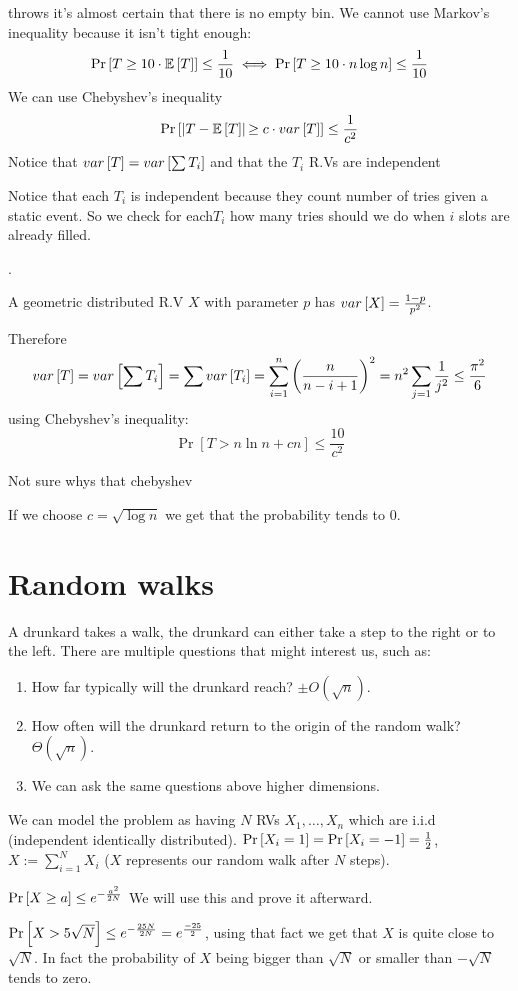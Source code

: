 throws it's almost certain that there is no empty bin. We cannot use
Markov's inequality because it isn't tight enough: 
\[
\Pr\left[T\ge10\cdot\mathbb{E}\left[T\right]\right]\le\frac{1}{10}\iff\Pr\left[T\ge10\cdot n\log n\right]\le\frac{1}{10}
\]
We can use Chebyshev's inequality
\[
\Pr\left[\left|T-\mathbb{E}\left[T\right]\right|\text{\ensuremath{\ge c\cdot var\left[T\right]}}\right]\le\frac{1}{c^{2}}
\]
Notice that $var\left[T\right]=var\left[\sum T_{i}\right]$ and that the $T_{i}$ R.Vs
are independent %
\begin{insight}
Notice that each $T_{i}$ is independent because they count number
of tries given a static event. So we check for each$T_{i}$ how many
tries should we do when $i$ slots are already filled.%
\end{insight}
. 
\begin{remark}
A geometric distributed R.V $X$ with parameter $p$ has $var\left[X\right]=\frac{1-p}{p^{2}}$.
\end{remark}

Therefore 
\[
var\left[T\right]=var\left[\sum T_{i}\right]=\sum var\left[T_{i}\right]=\sum_{i=1}^{n}\left(\frac{n}{n-i+1}\right)^{2}=n^{2}\sum_{j=1}\frac{1}{j^{2}}\le\frac{\pi^{2}}{6}
\]
 using Chebyshev's inequality: 
\[
\Pr\left[T>n\ln n+cn\right]\le\frac{10}{c^{2}}
\]

\begin{insight}
Not sure whys that chebyshev%
\end{insight}
{} If we choose $c=\sqrt{\log n}$ we get that the probability tends
to 0.

\section{Random walks}

A drunkard takes a walk, the drunkard can either take a step to the
right or to the left. There are multiple questions that might interest
us, such as: 
\begin{enumerate}
\item How far typically will the drunkard reach? $\pm O\left(\sqrt{n}\right)$. 
\item How often will the drunkard return to the origin of the random walk?
$\Theta\left(\sqrt{n}\right)$.
\item We can ask the same questions above higher dimensions. 
\end{enumerate}
We can model the problem as having $N$ RVs $X_{1},\dots,X_{n}$ which
are i.i.d (independent identically distributed). $\Pr\left[X_{i}=1\right]=\Pr\left[X_{i}=-1\right]=\frac{1}{2}$,
$X:=\sum\limits _{i=1}^{N}X_{i}$ ($X$ represents our random walk
after $N$ steps). 
\begin{proposition}
$\Pr\left[X\ge a\right]\le e^{-\frac{a^{2}}{2N}}$ We will use this and prove
it afterward. 
\begin{example}
$\Pr\left[X>5\sqrt{N}\right]\le e^{-\frac{25N}{2N}}=e^{\frac{-25}{2}}$, using
that fact we get that $X$ is quite close to $\sqrt{N}$. In fact
the probability of $X$ being bigger than $\sqrt{N}$ or smaller than
$-\sqrt{N}$ tends to zero.
\end{example}

\end{proposition}

